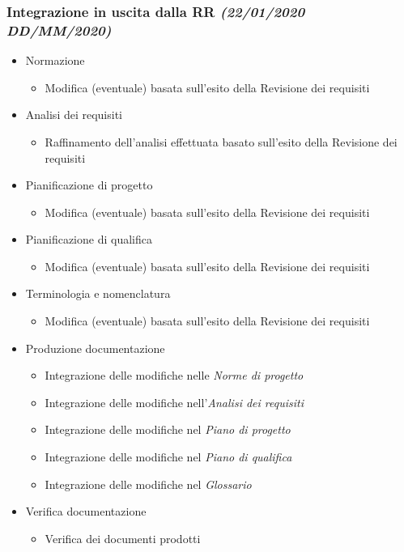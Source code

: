 \documentclass[../piano-di-progetto.tex]{subfiles}
\begin{document}
\subsubsection[Integrazione in uscita dalla RR]{Integrazione in uscita dalla RR {\normalsize\normalfont\itshape(22/01/2020  DD/MM/2020)}}%
\label{subs:integrazione_in_uscita_dalla_rr}
\begin{itemize}
  \item Normazione
  \begin{itemize}
    \item Modifica (eventuale) basata sull'esito della Revisione dei requisiti
  \end{itemize}
  \item Analisi dei requisiti
  \begin{itemize}
    \item Raffinamento dell'analisi effettuata basato sull'esito della Revisione dei requisiti
  \end{itemize}
  \item Pianificazione di progetto
  \begin{itemize}
    \item Modifica (eventuale) basata sull'esito della Revisione dei requisiti
  \end{itemize}
  \item Pianificazione di qualifica
  \begin{itemize}
    \item Modifica (eventuale) basata sull'esito della Revisione dei requisiti
  \end{itemize}
  \item Terminologia e nomenclatura
  \begin{itemize}
    \item Modifica (eventuale) basata sull'esito della Revisione dei requisiti
  \end{itemize}
  \item Produzione documentazione
  \begin{itemize}
    \item Integrazione delle modifiche nelle \textit{Norme di progetto}
    \item Integrazione delle modifiche nell'\textit{Analisi dei requisiti}
    \item Integrazione delle modifiche nel \textit{Piano di progetto}
    \item Integrazione delle modifiche nel \textit{Piano di qualifica}
    \item Integrazione delle modifiche nel \textit{Glossario}
  \end{itemize}
  \item Verifica documentazione
  \begin{itemize}
    \item Verifica dei documenti prodotti
  \end{itemize}
\end{itemize}
\end{document}
